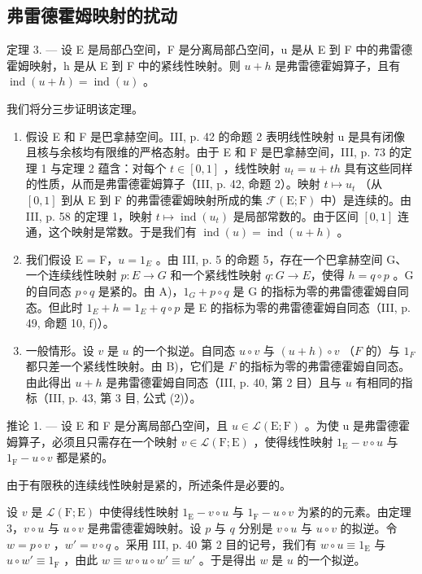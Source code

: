 \subsection{弗雷德霍姆映射的扰动}

定理 3. --- 设 E 是局部凸空间，F 是分离局部凸空间，u 是从 E 到 F 中的弗雷德霍姆映射，h 是从 E 到 F 中的紧线性映射。则 \(u + h\) 是弗雷德霍姆算子，且有 \(\operatorname{ind}(u + h) = \operatorname{ind}(u)\) 。

我们将分三步证明该定理。

\begin{enumerate}
\def\labelenumi{\Alph{enumi})}
\item
  假设 E 和 F 是巴拿赫空间。III, p. 42 的命题 2 表明线性映射 u 是具有闭像且核与余核均有限维的严格态射。由于 E 和 F 是巴拿赫空间，III, p. 73 的定理 1 与定理 2 蕴含：对每个 \(t \in [0,1]\) ，线性映射 \(u_t = u + th\) 具有这些同样的性质，从而是弗雷德霍姆算子（III, p. 42, 命题 2）。映射 \(t \mapsto u_t\) （从 \([0,1]\) 到从 E 到 F 的弗雷德霍姆映射所成的集 \(\mathcal{F}(\mathrm{E};\mathrm{F})\) 中）是连续的。由 III, p. 58 的定理 1，映射 \(t \mapsto \operatorname{ind}(u_t)\) 是局部常数的。由于区间 \([0,1]\) 连通，这个映射是常数。于是我们有 \(\operatorname{ind}(u) = \operatorname{ind}(u + h)\) 。
\item
  我们假设 E = F，\(u = 1_{E}\) 。由 III, p. 5 的命题 5，存在一个巴拿赫空间 G、一个连续线性映射 \(p: E \to G\) 和一个紧线性映射 \(q: G \to E\)，使得 \(h = q \circ p\) 。G 的自同态 \(p \circ q\) 是紧的。由 A)，\(1_{G} + p \circ q\) 是 G 的指标为零的弗雷德霍姆自同态。但此时 \(1_{E} + h = 1_{E} + q \circ p\) 是 E 的指标为零的弗雷德霍姆自同态（III, p. 49, 命题 10, f)）。
\item
  一般情形。设 \(v\) 是 \(u\) 的一个拟逆。自同态 \(u \circ v\) 与 \((u + h) \circ v\) （\(F\) 的）与 \(1_{F}\) 都只差一个紧线性映射。由 B)，它们是 \(F\) 的指标为零的弗雷德霍姆自同态。由此得出 \(u + h\) 是弗雷德霍姆自同态（III, p. 40, 第 2 目）且与 \(u\) 有相同的指标（III, p. 43, 第 3 目, 公式 (2)）。
\end{enumerate}

推论 1. --- 设 E 和 F 是分离局部凸空间，且 \(u \in \mathcal{L}(\mathrm{E};\mathrm{F})\) 。为使 u 是弗雷德霍姆算子，必须且只需存在一个映射 \(v \in \mathcal{L}(\mathrm{F};\mathrm{E})\) ，使得线性映射 \(1_{\mathrm{E}} - v \circ u\) 与 \(1_{\mathrm{F}} - u \circ v\) 都是紧的。

由于有限秩的连续线性映射是紧的，所述条件是必要的。

设 \(v\) 是 \(\mathcal{L}(\mathrm{F};\mathrm{E})\) 中使得线性映射 \(1_{\mathrm{E}} - v \circ u\) 与 \(1_{\mathrm{F}} - u \circ v\) 为紧的的元素。由定理 3，\(v \circ u\) 与 \(u \circ v\) 是弗雷德霍姆映射。设 \(p\) 与 \(q\) 分别是 \(v \circ u\) 与 \(u \circ v\) 的拟逆。令 \(w = p \circ v\) ，\(w' = v \circ q\) 。采用 III, p. 40 第 2 目的记号，我们有 \(w \circ u \equiv 1_{\mathrm{E}}\) 与 \(u \circ w' \equiv 1_{\mathrm{F}}\) ，由此 \(w \equiv w \circ u \circ w' \equiv w'\) 。于是得出 \(w\) 是 \(u\) 的一个拟逆。

